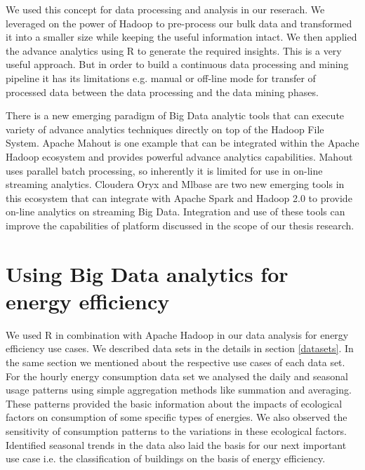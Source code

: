 We used this concept for data processing and analysis in our reserach. We leveraged on the power of Hadoop to pre-process our bulk data and transformed it into a smaller size while keeping the useful information intact. We then applied the advance analytics using R to generate the required insights. This is a very useful approach. But in order to build a continuous data processing and mining pipeline it has its limitations e.g. manual or off-line mode for transfer of processed data between the data processing and the data mining phases. 

There is a new emerging paradigm of Big Data analytic tools that can execute variety of advance analytics techniques directly on top of the Hadoop File System. Apache Mahout is one example that can be integrated within the Apache Hadoop ecosystem and provides powerful advance analytics capabilities. Mahout uses parallel batch processing, so inherently it is limited for use in on-line streaming analytics. Cloudera Oryx and Mlbase are two new emerging tools in this ecosystem that can integrate with Apache Spark and Hadoop 2.0 to provide on-line analytics on streaming Big Data. Integration and use of these tools can improve the capabilities of platform discussed in the scope of our thesis research.     

\section{Using Big Data analytics for energy efficiency}
We used R in combination with Apache Hadoop in our data analysis for energy efficiency use cases. We described data sets in the details in section \ref{datasets}. In the same section we mentioned about the respective use cases of each data set.  For the hourly energy consumption data set we analysed the daily and seasonal usage patterns using simple aggregation methods like summation and averaging. These patterns provided the basic information about the impacts of ecological factors on consumption of some specific types of energies. We also observed the sensitivity of consumption patterns to the variations in these ecological factors. Identified seasonal trends in the data also laid the basis for our next important use case i.e. the classification of buildings on the basis of energy efficiency. 

